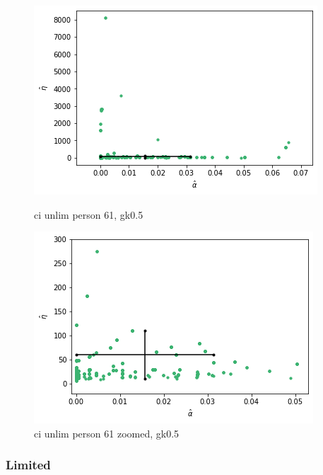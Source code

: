 \begin{figure}
    \centering
    \begin{minipage}{0.48\textwidth}
        \centering
        \includegraphics[scale=0.37]{pictures/Gamma=kappa=0.5/ci_unlim_person61_gk0.5.png}
        \caption{ci unlim person 61, gk0.5}
        \label{fig:ci_unlim_person_61_gk0.5}
    \end{minipage}\hfill
    \begin{minipage}{0.48\textwidth}
        \centering
        \includegraphics[scale=0.37]{pictures/Gamma=kappa=0.5/ci_unlim_person61_gk0.5_zoomed.png}
        \caption{ci unlim person 61 zoomed, gk0.5}
        \label{fig:ci_unlim_person_61_zoomed_gk0.5}
    \end{minipage}
\end{figure}


\subsubsection{Limited}

